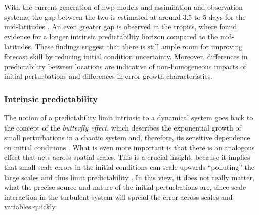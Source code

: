 With the current generation of \gls{nwp} models and assimilation and
observation systems, the gap between the two is estimated at around 3.5 to 5
days for the mid-latitudes \parencite{selzTransitionPracticalIntrinsic2022,
    zhangWhatPredictabilityLimit2019}. An even greater gap is observed in the
tropics, where \textcite{judtAtmosphericPredictabilityTropics2020} found
evidence for a longer intrinsic predictability horizon compared to the
mid-latitudes. These findings suggest that there is still ample room for
improving forecast skill by reducing initial condition uncertainty. Moreover,
differences in predictability between locations are indicative of
non-homogeneous impacts of initial perturbations and differences in
error-growth characteristics.

\subsubsection{Intrinsic predictability}

The notion of a predictability limit intrinsic to a dynamical system goes back
to the concept of the \emph{butterfly effect}, which describes the
exponential growth of small perturbations in a chaotic system and, therefore,
its sensitive dependence on initial conditions
\parencite{lorenzDeterministicNonperiodicFlow1963}. What is even more
important is that there is an analogous effect that acts across spatial scales.
This is a crucial insight, because it implies that small-scale errors in the
initial conditions can scale upwards \enquote{polluting} the large scales and
thus limit predictability \parencite{lorenzPredictabilityFlowWhich1969,
    palmerRealButterflyEffect2014}. In this view, it does not really matter,
what
the precise source and nature of the initial perturbations are, since scale
interaction in the turbulent system will spread the error across scales and
variables quickly.


